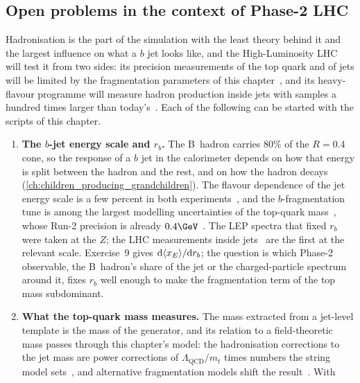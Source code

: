 \subsection*{Open problems in the context of Phase-2 LHC}
\label{sec:children_getting_married:open_problems}

Hadronisation is the part of the simulation with the least theory behind
it and the largest influence on what a $b$ jet looks like, and the
High-Luminosity LHC will test it from two sides: its precision
measurements of the top quark and of jets will be limited by the
fragmentation parameters of this chapter~\cite{Azzi:2019yne}, and its
heavy-flavour programme will measure hadron production inside jets with
samples a hundred times larger than today's~\cite{Cerri:2018ypt}. Each of
the following can be started with the scripts of this chapter.
\begin{enumerate}
  \item \textbf{The $b$-jet energy scale and $r_b$.} The B~hadron carries
    $80\%$ of the $R=0.4$ cone, so the response of a $b$ jet in the
    calorimeter depends on how that energy is split between the hadron
    and the rest, and on how the hadron decays
    (\cref{ch:children_producing_grandchildren}). The flavour dependence
    of the jet energy scale is a few percent in both
    experiments~\cite{CMS:2016lmd,ATLAS:2020cli}, and the $b$-fragmentation
    tune is among the largest modelling uncertainties of the top-quark
    mass~\cite{CMS:2018quc,CMS:2023ebf,Corcella:2017rpt}, whose Run-2
    precision is already $0.4\GeV$~\cite{ATLAS:2024dxp}. The LEP spectra
    that fixed $r_b$~\cite{ALEPH:2001pfo,OPAL:2002plk,SLD:2002poq,DELPHI:2011aa}
    were taken at the $Z$; the LHC measurements inside
    jets~\cite{ATLAS:2021agf,CMS:2021sln} are the first at the relevant
    scale. Exercise~9 gives $\mathrm{d}\langle x_E\rangle/\mathrm{d}r_b$;
    the question is which Phase-2 observable, the B~hadron's share of the
    jet or the charged-particle spectrum around it, fixes $r_b$ well
    enough to make the fragmentation term of the top mass subdominant.
  \item \textbf{What the top-quark mass measures.} The mass extracted from
    a jet-level template is the mass of the generator, and its relation to
    a field-theoretic mass passes through this chapter's model: the
    hadronisation corrections to the jet mass are power corrections of
    $\Lambda_{\mathrm{QCD}}/m_t$ times numbers the string model
    sets~\cite{Nason:2017cxd,Hoang:2020iah}, and alternative fragmentation
    models shift the result~\cite{Corcella:2010qgp,Corcella:2017rpt}. With

\end{enumerate}
